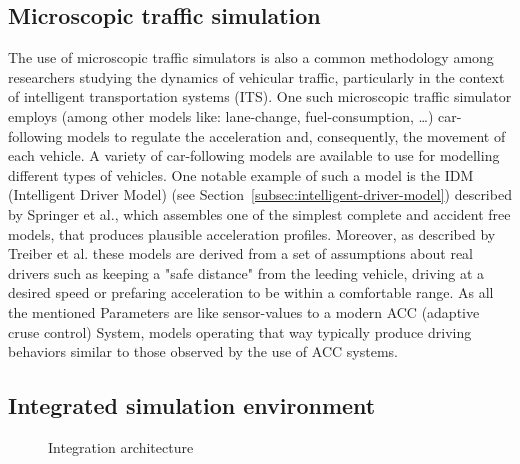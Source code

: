     \subsection{Microscopic traffic simulation}\label{subsec:microscopic-traffic-simulation}
        The use of microscopic traffic simulators is also a common methodology among researchers studying the dynamics of vehicular traffic, particularly in the context of intelligent transportation systems (ITS)\cite{toledo2005microscopic}.
        One such microscopic traffic simulator employs (among other models like: lane-change, fuel-consumption, \ldots) car-following models to regulate the acceleration and, consequently, the movement of each vehicle\cite{treiber2013traffic}.
        A variety of car-following models are available to use for modelling different types of vehicles.
        One notable example of such a model is the IDM (Intelligent Driver Model) (see Section~\ref{subsec:intelligent-driver-model}) described by Springer et al., which assembles one of the simplest complete and accident free models, that produces plausible acceleration profiles\cite{treiber2013traffic}.
        Moreover, as described by Treiber et al. these models are derived from a set of assumptions about real drivers such as keeping a "safe distance" from the leeding vehicle, driving at a desired speed or prefaring acceleration to be within a comfortable range.
        As all the mentioned Parameters are like sensor-values to a modern ACC (adaptive cruse control) System, models operating that way typically produce driving behaviors similar to those observed by the use of ACC systems\cite{treiber2013traffic}.

    \subsection{Integrated simulation environment}\label{subsec:integrated-simulation-environment}

        \begin{figure}
            \centering
            \caption{Integration architecture}
            \label{fig:int:architecture}
        \end{figure}

